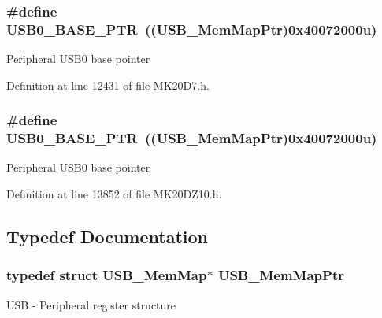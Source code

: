 \subsubsection[{\texorpdfstring{U\+S\+B0\+\_\+\+B\+A\+S\+E\+\_\+\+P\+TR}{USB0_BASE_PTR}}]{\setlength{\rightskip}{0pt plus 5cm}\#define U\+S\+B0\+\_\+\+B\+A\+S\+E\+\_\+\+P\+TR~(({\bf U\+S\+B\+\_\+\+Mem\+Map\+Ptr})0x40072000u)}\hypertarget{group___u_s_b___peripheral_ga598ff5eb20a0551af232710b3f27640a}{}\label{group___u_s_b___peripheral_ga598ff5eb20a0551af232710b3f27640a}
Peripheral U\+S\+B0 base pointer 

Definition at line 12431 of file M\+K20\+D7.\+h.

\subsubsection[{\texorpdfstring{U\+S\+B0\+\_\+\+B\+A\+S\+E\+\_\+\+P\+TR}{USB0_BASE_PTR}}]{\setlength{\rightskip}{0pt plus 5cm}\#define U\+S\+B0\+\_\+\+B\+A\+S\+E\+\_\+\+P\+TR~(({\bf U\+S\+B\+\_\+\+Mem\+Map\+Ptr})0x40072000u)}\hypertarget{group___u_s_b___peripheral_ga598ff5eb20a0551af232710b3f27640a}{}\label{group___u_s_b___peripheral_ga598ff5eb20a0551af232710b3f27640a}
Peripheral U\+S\+B0 base pointer 

Definition at line 13852 of file M\+K20\+D\+Z10.\+h.



\subsection{Typedef Documentation}
\subsubsection[{\texorpdfstring{U\+S\+B\+\_\+\+Mem\+Map\+Ptr}{USB_MemMapPtr}}]{\setlength{\rightskip}{0pt plus 5cm}typedef struct {\bf U\+S\+B\+\_\+\+Mem\+Map}$\ast$ {\bf U\+S\+B\+\_\+\+Mem\+Map\+Ptr}}\hypertarget{group___u_s_b___peripheral_gaabd989a49827dc34abb5de32732f4125}{}\label{group___u_s_b___peripheral_gaabd989a49827dc34abb5de32732f4125}
U\+SB -\/ Peripheral register structure 
